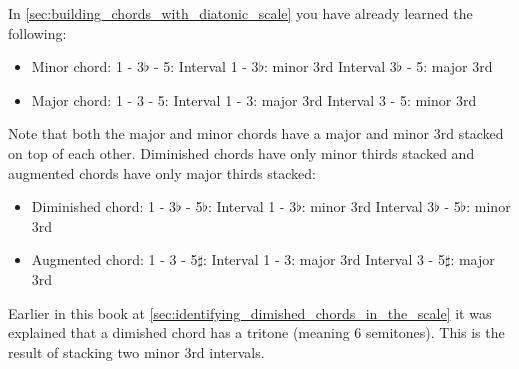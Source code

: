 In \autoref{sec:building_chords_with_diatonic_scale} you have already learned the following:

\begin{minipage}{0.5\textwidth}
	\begin{itemize}
		\item Minor chord: 1 - 3$\flat$ - 5:
			\subitem Interval 1 - 3$\flat$: minor 3rd
			\subitem Interval 3$\flat$ - 5: major 3rd
	\end{itemize}
\end{minipage}
\hfill
\begin{minipage}{0.5\textwidth}
	\begin{itemize}
		\item Major chord: 1 - 3 - 5:
			\subitem Interval 1 - 3: major 3rd
			\subitem Interval 3 - 5: minor 3rd
	\end{itemize}
\end{minipage}

Note that both the major and minor chords have a major and minor 3rd stacked on top of each other. Diminished chords have only minor thirds stacked and augmented chords have only major thirds stacked:

\begin{minipage}{0.5\textwidth}
	\begin{itemize}
		\item Diminished chord: 1 - 3$\flat$ - 5$\flat$:
			\subitem Interval 1 - 3$\flat$: minor 3rd
			\subitem Interval 3$\flat$ - 5$\flat$: minor 3rd
	\end{itemize}
\end{minipage}
\hfill
\begin{minipage}{0.5\textwidth}
	\begin{itemize}
		\item Augmented chord: 1 - 3 - 5$\sharp$:
			\subitem Interval 1 - 3: major 3rd
			\subitem Interval 3 - 5$\sharp$: major 3rd
	\end{itemize}
\end{minipage}

Earlier in this book at \autoref{sec:identifying_dimished_chords_in_the_scale} it was explained that a dimished chord has a tritone (meaning 6 semitones). This is the result of stacking two minor 3rd intervals.


